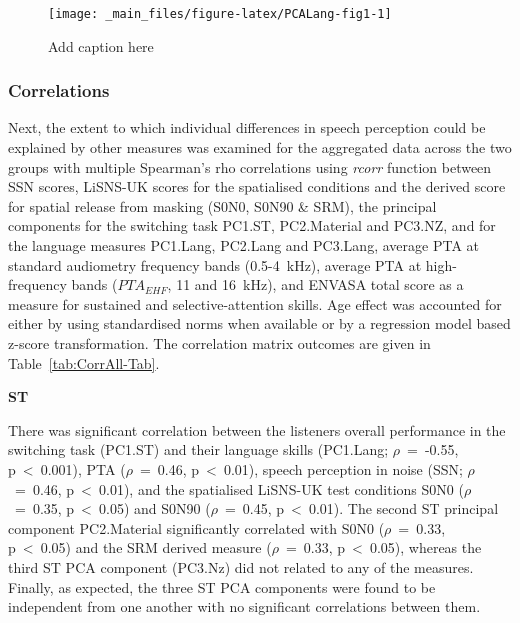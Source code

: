 \documentclass[a4paper, twoside]{templates/ociamthesis}
\begin{document}
\begin{figure}

{\centering \texttt{[image: \_main\_files/figure-latex/PCALang-fig1-1]} 

}

\caption{Add caption here}\label{fig:PCALang-fig1}
\end{figure}

\hypertarget{correlations}{%
\subsubsection{Correlations}\label{correlations}}

Next, the extent to which individual differences in speech perception could be explained by other measures was examined for the aggregated data across the two groups with multiple Spearman's rho correlations using \emph{rcorr} function \autocite[Hmisc R package;][]{HmiscPackageR} between SSN scores, LiSNS-UK scores for the spatialised conditions and the derived score for spatial release from masking (S0N0, S0N90 \& SRM), the principal components for the switching task PC1.ST, PC2.Material and PC3.NZ, and for the language measures PC1.Lang, PC2.Lang and PC3.Lang, average PTA at standard audiometry frequency bands (0.5-4~kHz), average PTA at high-frequency bands (\(PTA_{EHF}\), 11 and 16~kHz), and ENVASA total score as a measure for sustained and selective-attention skills. Age effect was accounted for either by using standardised norms when available or by a regression model based z-score transformation. The correlation matrix outcomes are given in Table~\ref{tab:CorrAll-Tab}.

\textbf{ST}

There was significant correlation between the listeners overall performance in the switching task (PC1.ST) and their language skills (PC1.Lang; \(\rho\)~=~-0.55, p~\textless~0.001), PTA (\(\rho\)~=~0.46, p~\textless~0.01), speech perception in noise (SSN; \(\rho\)~=~0.46, p~\textless~0.01), and the spatialised LiSNS-UK test conditions S0N0 (\(\rho\)~=~0.35, p~\textless~0.05) and S0N90 (\(\rho\)~=~0.45, p~\textless~0.01). The second ST principal component PC2.Material significantly correlated with S0N0 (\(\rho\)~=~0.33, p~\textless~0.05) and the SRM derived measure (\(\rho\)~=~0.33, p~\textless~0.05), whereas the third ST PCA component (PC3.Nz) did not related to any of the measures. Finally, as expected, the three ST PCA components were found to be independent from one another with no significant correlations between them.
\end{document}
